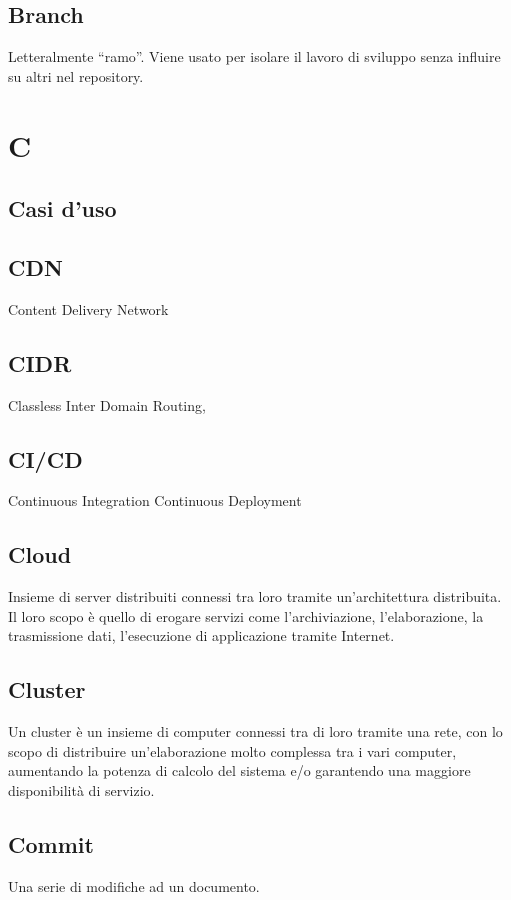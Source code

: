 \documentclass{classes/base}
\begin{document}
        \subsection*{Branch} 
        Letteralmente “ramo”. Viene usato per isolare il lavoro di sviluppo senza influire su altri nel repository. 
        
        \newpage  
    \section*{C}
        \subsection*{Casi d’uso} 

        \subsection*{CDN}
        Content Delivery Network
    
        \subsection*{CIDR}
        Classless Inter Domain Routing, 
    
        \subsection*{CI/CD}
        Continuous Integration Continuous Deployment 
    
        \subsection*{Cloud}
        Insieme di server distribuiti connessi tra loro tramite un'architettura distribuita. Il loro scopo è quello di erogare servizi come l'archiviazione, l'elaborazione, la trasmissione dati, l'esecuzione di applicazione tramite Internet.
        
        \subsection*{Cluster}
        Un cluster è un insieme di computer connessi tra di loro tramite una rete, con lo scopo di distribuire un'elaborazione molto complessa tra i vari computer, aumentando la potenza di calcolo del sistema e/o garantendo una maggiore disponibilità di servizio.
    
        \subsection*{Commit}
        Una serie di modifiche ad un documento. 
        
\end{document}
